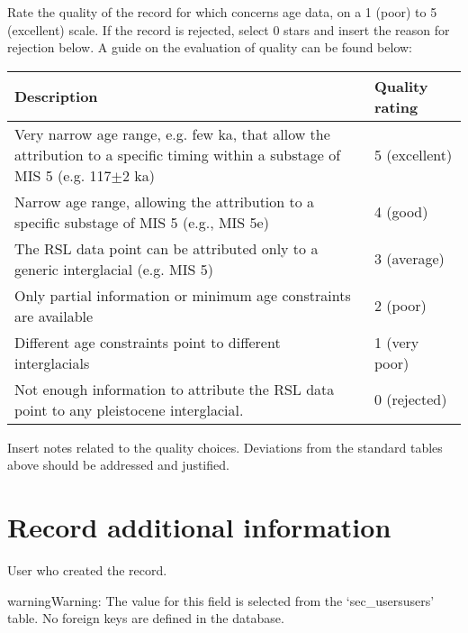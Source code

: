 \documentclass[letterpaper,10pt,english]{sphinxmanual}
\begin{document}
 \sphinxhyphen{} Rate the quality of the record for which concerns age data, on a 1 (poor) to 5 (excellent) scale. If the record is rejected, select 0 stars and insert the reason for rejection below. A guide on the evaluation of quality can be found below:


\begin{savenotes}\sphinxattablestart
\centering
\begin{tabulary}{\linewidth}[t]{|T|T|}
\hline

Description
&
Quality rating
\\
\hline
Very narrow age range, e.g. few ka, that allow the attribution to a specific timing within a substage of MIS 5 (e.g. 117\(\pm\)2 ka)
&
5 (excellent)
\\
\hline
Narrow age range, allowing the attribution to a specific substage of MIS 5 (e.g., MIS 5e)
&
4 (good)
\\
\hline
The RSL data point can be attributed only to a generic interglacial (e.g. MIS 5)
&
3 (average)
\\
\hline
Only partial information or minimum age constraints are available
&
2 (poor)
\\
\hline
Different age constraints point to different interglacials
&
1 (very poor)
\\
\hline
Not enough information to attribute the RSL data point to any pleistocene interglacial.
&
0 (rejected)
\\
\hline
\end{tabulary}
\par
\sphinxattableend\end{savenotes}

 \sphinxhyphen{} Insert notes related to the quality choices. Deviations from the standard tables above should be addressed and justified.


\section{Record additional information}
\label{\detokenize{RSL_data:record-additional-information}}
 \sphinxhyphen{} User who created the record.

\begin{sphinxadmonition}{warning}{Warning:}
The value for this field is selected from the ‘sec\_usersusers’ table. No foreign keys are defined in the database.
\end{sphinxadmonition}
\end{document}
